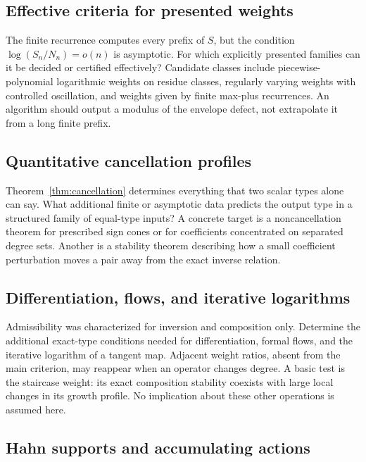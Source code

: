 \documentclass[11pt,a4paper]{article}
\numberwithin{equation}{section}
\theoremstyle{definition}
\theoremstyle{remark}
\begin{document}
\subsection{Effective criteria for presented weights}

The finite recurrence computes every prefix of $S$, but the condition
$\log(S_n/N_n)=o(n)$ is asymptotic. For which explicitly presented
families can it be decided or certified effectively? Candidate classes
include piecewise-polynomial logarithmic weights on residue classes,
regularly varying weights with controlled oscillation, and weights given
by finite max-plus recurrences. An algorithm should output a modulus of
the envelope defect, not extrapolate it from a long finite prefix.

\subsection{Quantitative cancellation profiles}

Theorem~\ref{thm:cancellation} determines everything that two scalar
types alone can say. What additional finite or asymptotic data predicts
the output type in a structured family of equal-type inputs? A concrete
target is a noncancellation theorem for prescribed sign cones or for
coefficients concentrated on separated degree sets. Another is a
stability theorem describing how a small coefficient perturbation moves
a pair away from the exact inverse relation.

\subsection{Differentiation, flows, and iterative logarithms}

Admissibility was characterized for inversion and composition only.
Determine the additional exact-type conditions needed for differentiation,
formal flows, and the iterative logarithm of a tangent map. Adjacent
weight ratios, absent from the main criterion, may reappear when an
operator changes degree. A basic test is the staircase weight: its exact
composition stability coexists with large local changes in its growth
profile. No implication about these other operations is assumed here.

\subsection{Hahn supports and accumulating actions}
\end{document}
